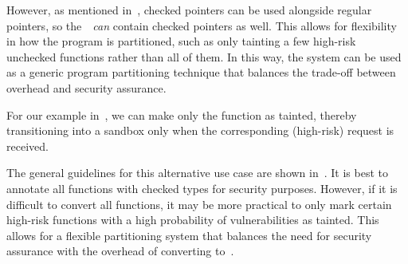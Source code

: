 However, as mentioned in~, checked pointers can be used alongside regular pointers, so the~\cregion{}~\emph{can} contain checked pointers as well.
%
This allows for flexibility in how the program is partitioned, such as only tainting a few high-risk unchecked functions rather than all of them. In this way, the system can be used as a generic program partitioning technique that balances the trade-off between overhead and security assurance.

For our example in~, we can make only the function  as tainted, thereby transitioning into a sandbox only when the corresponding (high-risk) request is received.

The general guidelines for this alternative use case are shown in~.
It is best to annotate all functions with checked types for security purposes. However, if it is difficult to convert all functions, it may be more practical to only mark certain high-risk functions with a high probability of vulnerabilities as tainted. This allows for a flexible partitioning system that balances the need for security assurance with the overhead of converting to~\checkedc.



